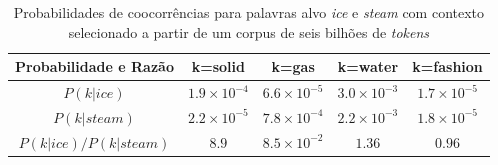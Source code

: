 \begin{table}[ht!]
    \caption[Probabilidade de coocorrências de palavras]{Probabilidades de coocorrências para palavras alvo \textit{ice} e \textit{steam} com contexto selecionado a partir de um corpus de seis bilhões de \textit{tokens}}
    \label{table:glove_prob_coocorrencia}
    \centering
    \begin{tabular}{c|c|c|c|c}
        \hline
        Probabilidade e Razão & k=solid         & k=gas           & k=water         & k=fashion       \\
        \hline
        $P(k|ice)$            & $1.9 \times 10^{-4}$ & $6.6 \times 10^{-5}$ & $3.0 \times 10^{-3}$ & $1.7 \times 10^{-5}$ \\
        \hline
        $P(k|steam)$          & $2.2 \times 10^{-5}$ & $7.8 \times 10^{-4}$ & $2.2 \times 10^{-3}$ & $1.8 \times 10^{-5}$ \\
        \hline
        $P(k|ice)/P(k|steam)$ & $8.9$           & $8.5 \times 10^{-2}$ & $1.36$          & $0.96$          \\
        \hline
    \end{tabular}
\end{table}


